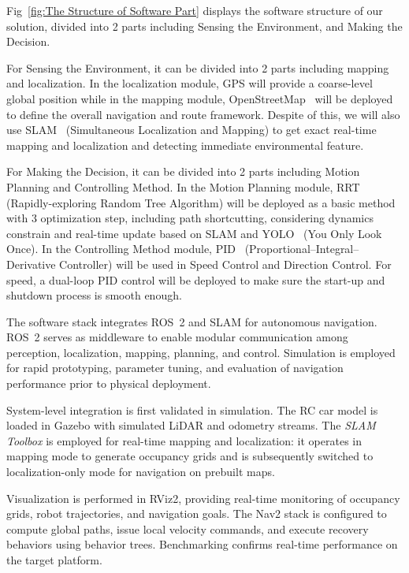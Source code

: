\documentclass[journal,transmag]{IEEEtran}
\begin{document}
Fig~\ref{fig:The Structure of Software Part} displays the software structure of our solution, divided into 2 parts including Sensing the Environment, and Making the Decision. 

For Sensing the Environment, it can be divided into 2 parts including mapping and localization. In the localization module, GPS will provide a coarse-level global position while in the mapping module, OpenStreetMap~\cite{OpenStreetMap} will be deployed to define the overall navigation and route framework. Despite of this, we will also use SLAM~\cite{SLAM} (Simultaneous Localization and Mapping) to get exact real-time mapping and localization and detecting immediate environmental feature. 

For Making the Decision, it can be divided into 2 parts including Motion Planning and Controlling Method. In the Motion Planning module, RRT~\cite{RRT} (Rapidly-exploring Random Tree Algorithm) will be deployed as a basic method with 3 optimization step, including path shortcutting, considering dynamics constrain and real-time update based on SLAM and YOLO~\cite{YOLO} (You Only Look Once). In the Controlling Method module, PID~\cite{PID} (Proportional–Integral–Derivative Controller) will be used in Speed Control and Direction Control. For speed, a dual-loop PID control will be deployed to make sure the start-up and shutdown process is smooth enough. 

The software stack integrates ROS~2 and SLAM for autonomous navigation. ROS~2 serves as middleware to enable modular communication among perception, localization, mapping, planning, and control. Simulation is employed for rapid prototyping, parameter tuning, and evaluation of navigation performance prior to physical deployment.

System-level integration is first validated in simulation. The RC car model is loaded in Gazebo with simulated LiDAR and odometry streams. The \textit{SLAM Toolbox} is employed for real-time mapping and localization: it operates in mapping mode to generate occupancy grids and is subsequently switched to localization-only mode for navigation on prebuilt maps.

Visualization is performed in RViz2, providing real-time monitoring of occupancy grids, robot trajectories, and navigation goals. The Nav2 stack is configured to compute global paths, issue local velocity commands, and execute recovery behaviors using behavior trees. Benchmarking confirms real-time performance on the target platform.
\end{document}

